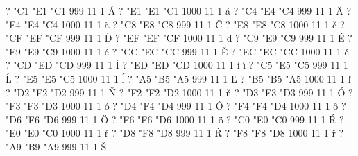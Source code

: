 

 

\let\csaccents=\relax \let\cmaccents=\relax

 


\setcharcode  ?  "C1  "E1  "C1   999  11  1  \texaccent \'A
\setcharcode  ?  "E1  "E1  "C1  1000  11  1  \texaccent \'a
\setcharcode  ?  "C4  "E4  "C4   999  11  1  \texaccent \"A
\setcharcode  ?  "E4  "E4  "C4  1000  11  1  \texaccent \"a
\setcharcode  ?  "C8  "E8  "C8   999  11  1  \texaccent \v C
\setcharcode  ?  "E8  "E8  "C8  1000  11  1  \texaccent \v c
\setcharcode  ?  "CF  "EF  "CF   999  11  1  \texaccent \v D
\setcharcode  ?  "EF  "EF  "CF  1000  11  1  \texaccent \v d
\setcharcode  ?  "C9  "E9  "C9   999  11  1  \texaccent \'E
\setcharcode  ?  "E9  "E9  "C9  1000  11  1  \texaccent \'e
\setcharcode  ?  "CC  "EC  "CC   999  11  1  \texaccent \v E
\setcharcode  ?  "EC  "EC  "CC  1000  11  1  \texaccent \v e
\setcharcode  ?  "CD  "ED  "CD   999  11  1  \texaccent \'I
\setcharcode  ?  "ED  "ED  "CD  1000  11  1  \texaccent \'i  \texaccent \'\i
\setcharcode  ?  "C5  "E5  "C5   999  11  1  \texaccent \'L
\setcharcode  ?  "E5  "E5  "C5  1000  11  1  \texaccent \'l
\setcharcode  ?  "A5  "B5  "A5   999  11  1  \texaccent \v L
\setcharcode  ?  "B5  "B5  "A5  1000  11  1  \texaccent \v l
\setcharcode  ?  "D2  "F2  "D2   999  11  1  \texaccent \v N
\setcharcode  ?  "F2  "F2  "D2  1000  11  1  \texaccent \v n
\setcharcode  ?  "D3  "F3  "D3   999  11  1  \texaccent \'O
\setcharcode  ?  "F3  "F3  "D3  1000  11  1  \texaccent \'o
\setcharcode  ?  "D4  "F4  "D4   999  11  1  \texaccent \^O
\setcharcode  ?  "F4  "F4  "D4  1000  11  1  \texaccent \^o
\setcharcode  ?  "D6  "F6  "D6   999  11  1  \texaccent \"O
\setcharcode  ?  "F6  "F6  "D6  1000  11  1  \texaccent \"o
\setcharcode  ?  "C0  "E0  "C0   999  11  1  \texaccent \'R
\setcharcode  ?  "E0  "E0  "C0  1000  11  1  \texaccent \'r
\setcharcode  ?  "D8  "F8  "D8   999  11  1  \texaccent \v R
\setcharcode  ?  "F8  "F8  "D8  1000  11  1  \texaccent \v r
\setcharcode  ?  "A9  "B9  "A9   999  11  1  \texaccent \v S
